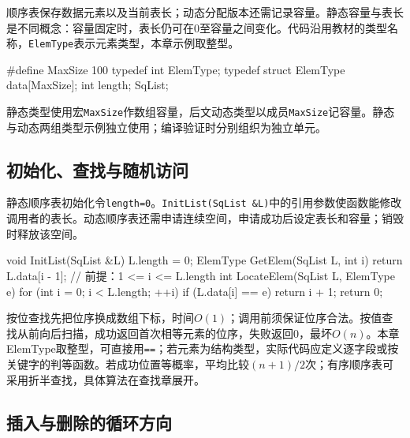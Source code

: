 顺序表保存数据元素以及当前表长；动态分配版本还需记录容量。静态容量与表长是不同概念：容量固定时，表长仍可在0至容量之间变化。代码沿用教材的类型名称，\texttt{ElemType}表示元素类型，本章示例取整型。

\par\medskip\noindent\begin{minipage}{\linewidth}
\begin{codeblock}[language=C++]
#define MaxSize 100
typedef int ElemType;
typedef struct {
    ElemType data[MaxSize];
    int length;
} SqList;
\end{codeblock}
\end{minipage}\par\medskip

静态类型使用宏\texttt{MaxSize}作数组容量，后文动态类型以成员\texttt{MaxSize}记容量。静态与动态两组类型示例独立使用；编译验证时分别组织为独立单元。

\subsection{初始化、查找与随机访问}\label{DS02-seq-query}

静态顺序表初始化令\texttt{length=\allowbreak{}0}。\texttt{InitList(\allowbreak{}SqList \&L)\allowbreak{}}中的引用参数使函数能修改调用者的表长。动态顺序表还需申请连续空间，申请成功后设定表长和容量；销毁时释放该空间。

\par\medskip\noindent\begin{minipage}{\linewidth}
\begin{codeblock}[language=C++]
void InitList(SqList &L) { L.length = 0; }
ElemType GetElem(SqList L, int i) {
    return L.data[i - 1];  // 前提：1 <= i <= L.length
}
int LocateElem(SqList L, ElemType e) {
    for (int i = 0; i < L.length; ++i)
        if (L.data[i] == e) return i + 1;
    return 0;
}
\end{codeblock}
\end{minipage}\par\medskip

按位查找先把位序换成数组下标，时间\(O(1)\)；调用前须保证位序合法。按值查找从前向后扫描，成功返回首次相等元素的位序，失败返回0，最坏\(O(n)\)。本章ElemType取整型，可直接用\texttt{=\allowbreak{}=\allowbreak{}}；若元素为结构类型，实际代码应定义逐字段或按关键字的判等函数。若成功位置等概率，平均比较\((n+1)/2\)次；有序顺序表可采用折半查找，具体算法在查找章展开。

\subsection{插入与删除的循环方向}\label{DS02-seq-update}

